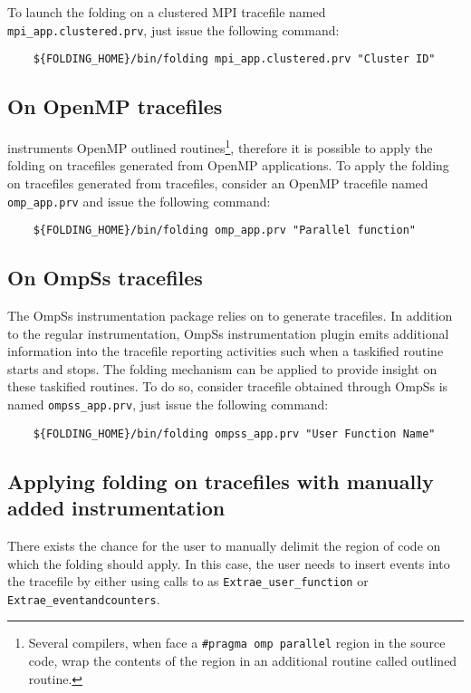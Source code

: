 To launch the folding on a clustered MPI tracefile named \texttt{mpi\_app.clustered.prv}, just issue the following command:
\begin{verbatim}
	${FOLDING_HOME}/bin/folding mpi_app.clustered.prv "Cluster ID"
\end{verbatim}

\subsection{On OpenMP tracefiles}

\TRACE instruments OpenMP outlined routines\footnote{Several compilers, when face a \texttt{\#pragma omp parallel} region in the source code, wrap the contents of the region in an additional routine called outlined routine.}, therefore it is possible to apply the folding on tracefiles generated from OpenMP applications.
To apply the folding on tracefiles generated from tracefiles, consider an OpenMP tracefile named \texttt{omp\_app.prv} and issue the following command:
\begin{verbatim}
	${FOLDING_HOME}/bin/folding omp_app.prv "Parallel function"
\end{verbatim}

\subsection{On OmpSs tracefiles}

The OmpSs instrumentation package relies on \TRACE to generate tracefiles.
In addition to the regular instrumentation, OmpSs instrumentation plugin emits additional information into the tracefile reporting activities such when a taskified routine starts and stops.
The folding mechanism can be applied to provide insight on these taskified routines.
To do so, consider tracefile obtained through OmpSs is named \texttt{ompss\_app.prv}, just issue the following command:
\begin{verbatim}
	${FOLDING_HOME}/bin/folding ompss_app.prv "User Function Name"
\end{verbatim}

\subsection{Applying folding on tracefiles with manually added instrumentation}

There exists the chance for the user to manually delimit the region of code on which the folding should apply.
In this case, the user needs to insert events into the tracefile by either using calls to \TRACE as \texttt{Extrae\_user\_function} or \texttt{Extrae\_eventandcounters}.

